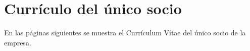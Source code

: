 \chapter{Currículo del único socio}
\label{chap:cv}

En las páginas siguientes se muestra el Currículum Vítae del único socio de la empresa.


